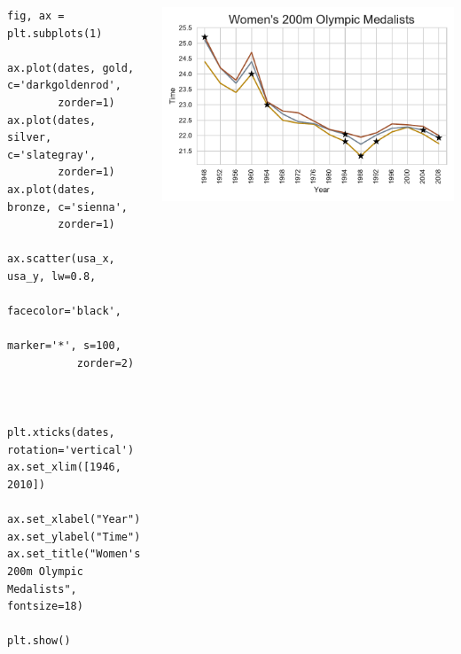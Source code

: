 \documentclass{beamer}
\begin{document}
\begin{frame}[fragile]
\tiny{
\begin{columns}
\begin{column}{0.45\textwidth}
\begin{verbatim}
fig, ax = plt.subplots(1)

ax.plot(dates, gold, c='darkgoldenrod',
        zorder=1)
ax.plot(dates, silver, c='slategray',
        zorder=1)
ax.plot(dates, bronze, c='sienna',
        zorder=1)

ax.scatter(usa_x, usa_y, lw=0.8,
           facecolor='black',
           marker='*', s=100,
           zorder=2)



plt.xticks(dates, rotation='vertical')
ax.set_xlim([1946, 2010])

ax.set_xlabel("Year")
ax.set_ylabel("Time")
ax.set_title("Women's 200m Olympic Medalists", fontsize=18)

plt.show()
\end{verbatim}
\end{column}
\begin{column}{0.55\textwidth}
\includegraphics[width=\textwidth]{../olympics_6.pdf}
\end{column}
\end{columns}
}
\end{frame}
\end{document}
